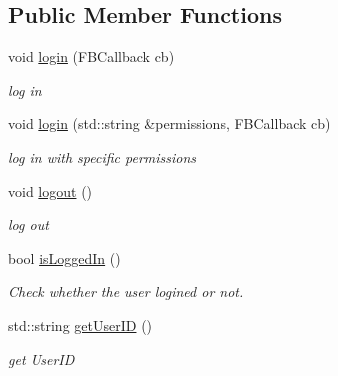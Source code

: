 \subsection*{Public Member Functions}
\begin{DoxyCompactItemize}
\item 
void \hyperlink{classcocos2d_1_1plugin_1_1FacebookAgent_ab6740650d8d2b6f95579fdf9f7f3db6a}{login} (F\+B\+Callback cb)
\begin{DoxyCompactList}\small\item\em log in \end{DoxyCompactList}\item 
void \hyperlink{classcocos2d_1_1plugin_1_1FacebookAgent_a4d0ee1bb13f4fe4b3023acc0c9d4cea1}{login} (std\+::string \&permissions, F\+B\+Callback cb)
\begin{DoxyCompactList}\small\item\em log in with specific permissions \end{DoxyCompactList}\item 
\mbox{\label{classcocos2d_1_1plugin_1_1FacebookAgent_a71329809e853f0b37673526a673fd32c}} 
void \hyperlink{classcocos2d_1_1plugin_1_1FacebookAgent_a71329809e853f0b37673526a673fd32c}{logout} ()
\begin{DoxyCompactList}\small\item\em log out \end{DoxyCompactList}\item 
\mbox{\label{classcocos2d_1_1plugin_1_1FacebookAgent_a456dda870184785818812c2e13eb003b}} 
bool \hyperlink{classcocos2d_1_1plugin_1_1FacebookAgent_a456dda870184785818812c2e13eb003b}{is\+Logged\+In} ()
\begin{DoxyCompactList}\small\item\em Check whether the user logined or not. \end{DoxyCompactList}\item 
\mbox{\label{classcocos2d_1_1plugin_1_1FacebookAgent_a00a8098bf1d2e0ad2d6ef69a7ab42b16}} 
std\+::string \hyperlink{classcocos2d_1_1plugin_1_1FacebookAgent_a00a8098bf1d2e0ad2d6ef69a7ab42b16}{get\+User\+ID} ()
\begin{DoxyCompactList}\small\item\em get User\+ID \end{DoxyCompactList}\item 

\end{DoxyCompactItemize}
